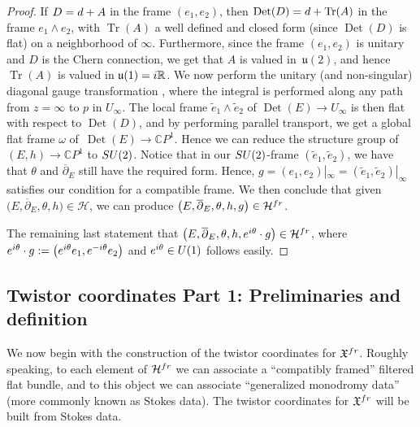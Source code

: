 \documentclass[11pt]{article}
\numberwithin{equation}{section}
\numberwithin{equation}{section}
\newcommand{\CP}{\mathbb{C}P^1}
\begin{document}
\begin{proof}
If $D={\rm d}+A$ in the frame $(e_1,e_2)$, then $\operatorname{Det}(D)={\rm d}+\operatorname{Tr}(A)$ in the frame $e_1\wedge e_2$, with $\operatorname{Tr}(A)$ a well defined and closed form (since $\operatorname{Det}(D)$ is flat) on a neighborhood of $\infty$. Furthermore, since the frame $(e_1,e_2)$ is unitary and $D$ is the Chern connection, we get that $A$ is valued in~$\mathfrak{u}(2)$, and hence $\operatorname{Tr}(A)$ is valued in $\mathfrak{u}(1)={\rm i}\mathbb{R}$. We now perform the unitary (and non-singular) diagonal gauge transformation , where the integral is performed along any path from $z=\infty$ to $p$ in $U_{\infty}$. The local frame $\widetilde{e}_1\wedge \widetilde{e}_2$ of $\operatorname{Det}(E)\to U_{\infty}$ is then flat with respect to $\operatorname{Det}(D)$, and by performing parallel transport, we get a global flat frame $\omega$ of~${\operatorname{Det}(E)\to \CP}$. Hence we can reduce the structure group of $(E,h)\to \CP$ to ${\rm SU}(2)$. Notice that in our ${\rm SU}(2)$-frame $(\widetilde{e}_1,\widetilde{e}_2)$, we have that $\theta$ and $\overline{\partial}_E$ still have the required form. Hence, $g=(e_1,e_2)|_{\infty}=(\widetilde{e}_1,\widetilde{e}_2)|_{\infty}$ satisfies our condition for a compatible frame. We then conclude that given $\bigl(E,\overline{\partial}_E,\theta,h\bigr) \in \mathcal{H}$, we can produce $\bigl(E,\overline{\partial}_E,\theta,h,g\bigr)\in \mathcal{H}^{{\rm fr}}$.

The remaining last statement that $\bigl(E,\overline{\partial}_E,\theta,h, {\rm e}^{{\rm i}\theta}\cdot g\bigr)\in \mathcal{H}^{{\rm fr}}$, where ${\rm e}^{{\rm i}\theta}\cdot g:=\bigl({\rm e}^{{\rm i}\theta}e_1,{\rm e}^{-{\rm i}\theta}e_2\bigr)$ and ${\rm e}^{{\rm i}\theta}\in {\rm U}(1)$ follows easily.
\end{proof}

\subsection{Twistor coordinates Part 1: Preliminaries and definition}\label{sec3.4}

We now begin with the construction of the twistor coordinates for $\mathfrak{X}^{{\rm fr}}$. Roughly speaking, to each element of $\mathcal{H}^{{\rm fr}}$ we can associate a ``compatibly framed'' filtered flat bundle, and to this object we can associate ``generalized monodromy data'' (more commonly known as Stokes data). The twistor coordinates for $\mathfrak{X}^{{\rm fr}}$ will be built from Stokes data.
\end{document}
